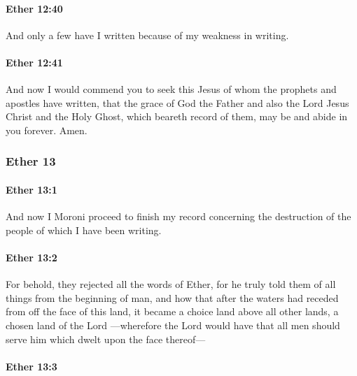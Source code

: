 		\paragraph{Ether 12:40} %
			\label{ETHER-12-40}

			And only a few have I written because of my weakness in writing.

		\paragraph{Ether 12:41} %
			\label{ETHER-12-41}

			And now I would commend you to seek this Jesus
			of whom the prophets and apostles have written,
			that the grace of God the Father and also the Lord Jesus Christ
			and the Holy Ghost, which beareth record of them,
			may be and abide in you forever.
			Amen.

	\subsubsection{Ether 13} %
		\label{ETHER-13}
		
		\paragraph{Ether 13:1} %
			\label{ETHER-13-1}

			And now I Moroni proceed to finish my record
			concerning the destruction of the people of which I have been writing.

		\paragraph{Ether 13:2} %
			\label{ETHER-13-2}

			For behold, they rejected all the words of Ether,
			for he truly told them of all things from the beginning of man,
			and how that after the waters had receded from off the face of this land,
			it became a choice land above all other lands, a chosen land of the Lord
			---wherefore the Lord would have that all men should serve him
			which dwelt upon the face thereof---

		\paragraph{Ether 13:3} %
			\label{ETHER-13-3}

